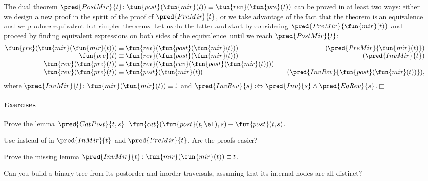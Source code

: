 The dual theorem \(\pred{PostMir}{t}
\colon \fun{post}(\fun{mir}(t)) \equiv
\fun{rev}(\fun{pre}(t))\)
 
 can be proved in at least two ways: either we
design a new proof in the spirit of the proof of \(\pred{PreMir}{t}\),
or we take advantage of the fact that the theorem is an equivalence
and we produce equivalent but simpler theorems. Let us do the latter
and start by considering \(\pred{PreMir}{\fun{mir}(t)}\)
 and proceed by finding equivalent
expressions on both sides of the equivalence, until we reach
\(\pred{PostMir}{t}\):
\begin{equation*}
\begin{array}{@{}r@{\;}c@{\;}l@{\qquad}r@{}}
          \fun{pre}(\fun{mir}(\fun{mir}(t)))
& \equiv
& \fun{rev}(\fun{post}(\fun{mir}(t)))
& (\pred{PreMir}{\fun{mir}(t)})\\
  \fun{pre}(t)
& \equiv
& \fun{rev}(\fun{post}(\fun{mir}(t)))
& (\pred{InvMir}{t})\\
  \fun{rev}(\fun{pre}(t))
& \equiv
& \fun{rev}(\fun{rev}(\fun{post}(\fun{mir}(t))))\\
  \fun{rev}(\fun{pre}(t))
& \equiv
& \fun{post}(\fun{mir}(t))
& (\pred{InvRev}{\fun{post}(\fun{mir}(t))}),
\end{array}
\end{equation*}
where \(\pred{InvMir}{t} \colon
\fun{mir}(\fun{mir}(t)) \equiv t\) and
\(\pred{InvRev}{s} :\Leftrightarrow \pred{Inv}{s} \wedge
\pred{EqRev}{s}\).\hfill\(\Box\)

\paragraph{Exercises}
\begin{enumerate*}

  \item Prove the lemma
  \(\pred{CatPost}{t,s} \colon \fun{cat}(\fun{post}(t,\el),s) \equiv
  \fun{post}(t,s)\).

  \item Use  instead of  in
  \(\pred{InMir}{t}\) and \(\pred{PreMir}{t}\). Are the proofs easier?

  \item Prove the missing lemma
  \(\pred{InvMir}{t} \colon \fun{mir}(\fun{mir}(t)) \equiv
  t\).\label{ex:mir_mir}

  \item Can you build a binary tree from its postorder and inorder
    traversals, assuming that its internal nodes are all distinct?

\end{enumerate*}

